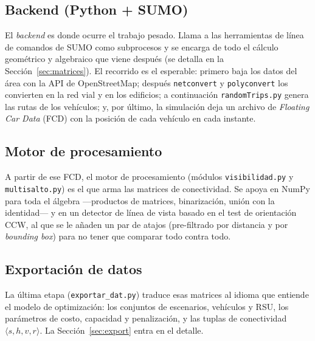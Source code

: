 \documentclass[smartcities,article,submit,oneauthor]{Definitions/mdpi}
\begin{document}
\subsection{Backend (Python + SUMO)}
El \emph{backend} es donde ocurre el trabajo pesado. Llama a las herramientas de
línea de comandos de SUMO como subprocesos y se encarga de todo el cálculo
geométrico y algebraico que viene después (se detalla en la
Sección~\ref{sec:matrices}). El recorrido es el esperable: primero baja los datos del
área con la API de OpenStreetMap; después \texttt{netconvert} y \texttt{polyconvert}
los convierten en la red vial y en los edificios; a continuación
\texttt{randomTrips.py} genera las rutas de los vehículos; y, por último, la
simulación deja un archivo de \emph{Floating Car Data} (FCD) con la posición de cada
vehículo en cada instante.

\subsection{Motor de procesamiento}
A partir de ese FCD, el motor de procesamiento (módulos \texttt{visibilidad.py} y
\texttt{multisalto.py}) es el que arma las matrices de conectividad. Se apoya en
NumPy para toda el álgebra ---productos de matrices, binarización, unión con la
identidad--- y en un detector de línea de vista basado en el test de orientación
CCW, al que se le añaden un par de atajos (pre-filtrado por distancia y por
\emph{bounding box}) para no tener que comparar todo contra todo.

\subsection{Exportación de datos}
La última etapa (\texttt{exportar\_dat.py}) traduce esas matrices al idioma que
entiende el modelo de optimización: los conjuntos de escenarios, vehículos y RSU, los
parámetros de costo, capacidad y penalización, y las tuplas de conectividad
$\langle s,h,v,r\rangle$. La Sección~\ref{sec:export} entra en el detalle.
\end{document}
